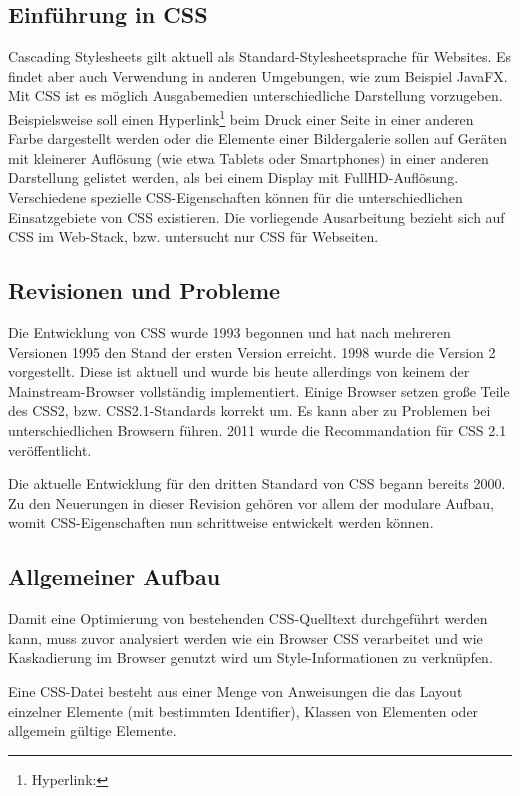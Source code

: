 \documentclass[11pt]{scrartcl}
\begin{document}
\subsection{Einführung in CSS}

Cascading Stylesheets gilt aktuell als Standard-Stylesheetsprache für Websites. Es findet aber auch Verwendung in anderen Umgebungen, wie zum Beispiel JavaFX. Mit CSS ist es möglich Ausgabemedien unterschiedliche Darstellung vorzugeben. Beispielsweise soll einen Hyperlink\footnote{Hyperlink:} beim Druck einer Seite in einer anderen Farbe dargestellt werden oder die Elemente einer Bildergalerie sollen auf Geräten mit kleinerer Auflösung (wie etwa Tablets oder Smartphones) in einer anderen Darstellung gelistet werden, als bei einem Display mit FullHD-Auflösung. Verschiedene spezielle CSS-Eigenschaften können für die unterschiedlichen Einsatzgebiete von CSS existieren. Die vorliegende Ausarbeitung bezieht sich auf CSS im Web-Stack, bzw. untersucht nur CSS für Webseiten. 

\subsection{Revisionen und Probleme}
Die Entwicklung von CSS wurde 1993 begonnen und hat nach mehreren Versionen 1995 den Stand der ersten Version erreicht. 1998 wurde die Version 2 vorgestellt. Diese ist aktuell und wurde bis heute allerdings von keinem der Mainstream-Browser vollständig implementiert. Einige Browser setzen große Teile des CSS2, bzw. CSS2.1-Standards korrekt um. Es kann aber zu Problemen bei unterschiedlichen Browsern führen. 2011 wurde die Recommandation für CSS 2.1 veröffentlicht. 

Die aktuelle Entwicklung für den dritten Standard von CSS begann bereits 2000. Zu den Neuerungen in dieser Revision gehören vor allem der modulare Aufbau, womit CSS-Eigenschaften nun schrittweise entwickelt werden können. 

\subsection{Allgemeiner Aufbau}

Damit eine Optimierung von bestehenden CSS-Quelltext durchgeführt werden kann, muss zuvor analysiert werden wie ein Browser CSS verarbeitet und wie Kaskadierung im Browser genutzt wird um Style-Informationen zu verknüpfen.

Eine CSS-Datei besteht aus einer Menge von Anweisungen die das Layout einzelner Elemente (mit bestimmten Identifier), Klassen von Elementen oder allgemein gültige Elemente.
\end{document}
